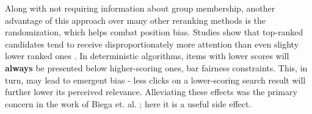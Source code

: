 Along with not requiring information about group membership, another advantage of this approach over many other reranking methods is the randomization, which helps combat position bias. Studies show that top-ranked candidates tend to receive disproportionately more attention than even slighty lower ranked ones \cite{10.1145/1341531.1341545} \cite{joachims2007search}. In deterministic algorithms, items with lower scores will \textbf{always} be presented below higher-scoring ones, bar fairness constraints. This, in turn, may lead to emergent bias - less clicks on a lower-scoring search result will further lower its perceived relevance. Alleviating these effects was the primary concern in the work of Biega et. al. \cite{equityofattentionBiega}; here it is a useful side effect.




